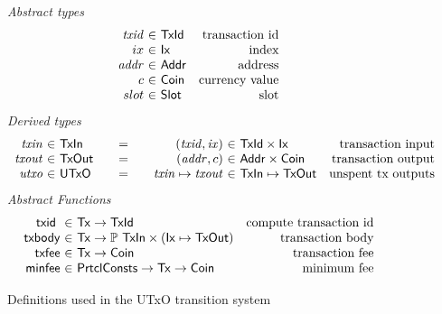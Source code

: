 \documentclass[11pt,a4paper]{article}
\newcommand{\Tx}{\type{Tx}}
\newcommand{\Ix}{\type{Ix}}
\newcommand{\TxId}{\type{TxId}}
\newcommand{\Addr}{\type{Addr}}
\newcommand{\UTxO}{\type{UTxO}}
\newcommand{\Coin}{\type{Coin}}
\newcommand{\PrtclConsts}{\type{PrtclConsts}}
\newcommand{\Slot}{\type{Slot}}
\newcommand{\TxIn}{\type{TxIn}}
\newcommand{\TxOut}{\type{TxOut}}
\newcommand{\txid}[1]{\fun{txid}~ \var{#1}}
\theoremstyle{definition}
\theoremstyle{definition}
\begin{document}
\begin{figure*}
  \emph{Abstract types}
  \begin{equation*}
    \begin{array}{r@{~\in~}lr}
      \var{txid} & \TxId & \text{transaction id}\\
      ix & \Ix & \text{index}\\
      \var{addr} & \Addr & \text{address}\\
      c & \Coin & \text{currency value}\\
      slot & \Slot & \text{slot}
    \end{array}
  \end{equation*}
  \emph{Derived types}
  \begin{equation*}
    \begin{array}{r@{~\in~}l@{\qquad=\qquad}r@{~\in~}lr}
      \var{txin}
      & \TxIn
      & (\var{txid}, \var{ix})
      & \TxId \times \Ix
      & \text{transaction input}
      \\
      \var{txout}
      & \type{TxOut}
      & (\var{addr}, c)
      & \Addr \times \Coin
      & \text{transaction output}
      \\
      \var{utxo}
      & \UTxO
      & \var{txin} \mapsto \var{txout}
      & \TxIn \mapsto \TxOut
      & \text{unspent tx outputs}
    \end{array}
  \end{equation*}
  \emph{Abstract Functions}
  \begin{equation*}
    \begin{array}{r@{~\in~}lr}
      \txid{} & \Tx \to \TxId & \text{compute transaction id}\\
      \fun{txbody} & \Tx \to \powerset{\TxIn} \times (\Ix \mapsto \TxOut)
                                  & \text{transaction body}\\
      \fun{txfee} & \Tx \to \Coin & \text{transaction fee}\\
      \fun{minfee} & \PrtclConsts \to \Tx \to \Coin & \text{minimum fee}
    \end{array}
  \end{equation*}
  \caption{Definitions used in the UTxO transition system}
  \label{fig:defs:utxo}
\end{figure*}
\end{document}
